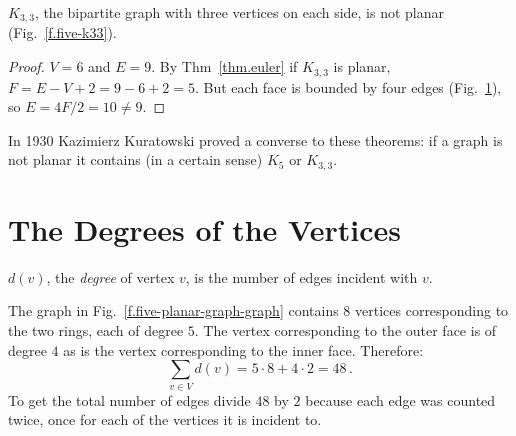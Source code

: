 \begin{theorem}
$K_{3,3}$, the bipartite graph with three vertices on each side, is not planar (Fig.~\ref{f.five-k33}).
\end{theorem}

\begin{figure}[b]
\subfigures
{}
\hfill
{}
\label{f.five-k33}
\label{f.five-k33-failed}
\end{figure}

\begin{proof}
$V=6$ and $E=9$. By Thm~\ref{thm.euler} if $K_{3,3}$ is planar, $F=E-V+2=9-6+2=5$. But each face is bounded by four edges (Fig.~\ref{f.five-k33-failed}), so $E=4F/2=10\neq 9$.
\end{proof}

In 1930 Kazimierz Kuratowski proved a converse to these theorems: if a graph is not planar it contains (in a certain sense) $K_5$ or $K_{3,3}$.

\section{The Degrees of the Vertices}\label{s.degrees}

\begin{definition}
$d(v)$, the \emph{degree} of vertex $v$, is the number of edges incident with $v$.
\end{definition}

\begin{example}
The graph in Fig.~\ref{f.five-planar-graph-graph} contains $8$ vertices corresponding to the two rings, each of degree $5$. The vertex corresponding to the outer face is of degree $4$ as is the vertex corresponding to the inner face. Therefore:
\[
\sum_{v\in V} d(v) = 5\cdot 8 + 4\cdot 2=48\,.
\]
To get the total number of edges divide $48$ by $2$ because  each edge was counted twice, once for each of the vertices it is incident to.
\end{example}


